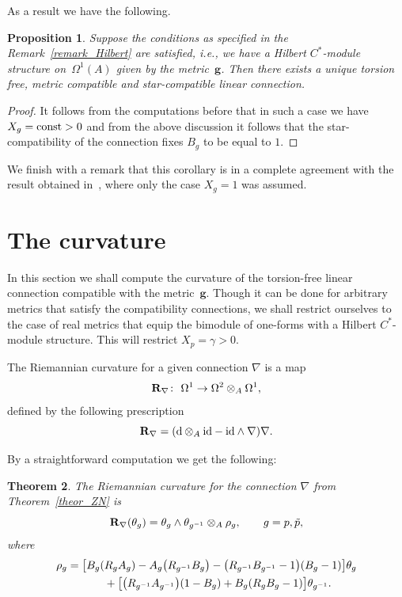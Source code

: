 \documentclass[10pt,a4paper]{amsart}
\numberwithin{equation}{section}
\newtheorem{Theorem}{Theorem}[section]
\newtheorem{Proposition}[Theorem]{Proposition}
 { \theoremstyle{definition}
\newtheorem{Definition}[Theorem]{Definition}
\newtheorem{Example}[Theorem]{Example}
\newtheorem{Remark}[Theorem]{Remark} }
\begin{document}
As a result we have the following.
\begin{Proposition} Suppose the conditions as specified in the Remark~{\rm \ref{remark_Hilbert}} are satisfied, i.e., we have a Hilbert $C^\ast$-module structure on~$\Omega^1(A)$ given by the metric~$\mathbf{g}$. Then there exists a unique torsion free, metric compatible and star-compatible linear
connection.
\end{Proposition}
\begin{proof}
It follows from the computations before that in such a case we have $X_g={\rm const}>0$ and from the above discussion it follows that the star-compatibility of the connection fixes $B_g$ to be equal to $1$.
\end{proof}

We finish with a remark that this corollary is in a complete agreement with the result obtained in~\cite{majid2020}, where only the case $X_g=1$ was
assumed.

\section{The curvature}
In this section we shall compute the curvature of the torsion-free linear connection compatible
with the metric~$\mathbf{g}$. Though it can be done for arbitrary metrics that satisfy the
compatibility connections, we shall restrict ourselves to the case of real metrics that equip
the bimodule of one-forms with a Hilbert $C^\ast$-module structure. This will restrict
$X_p=\gamma>0$.

\begin{Definition}
The Riemannian curvature for a given connection $\nabla$ is a map
\begin{equation*}
{\bf R}_\nabla\colon \ \Omega^1 \rightarrow \Omega^2 \otimes_A \Omega^1,
\end{equation*}
defined by the following prescription
\begin{equation*}
{\bf R}_\nabla= ({\rm d}\otimes_A\mathrm{id} -\mathrm{id}\wedge \nabla )\nabla.
\end{equation*}
\end{Definition}
By a straightforward computation we get the following:
\begin{Theorem}
The Riemannian curvature for the connection $\nabla$ from Theorem~{\rm \ref{theor_ZN}} is
\begin{equation*}
{\bf R}_\nabla(\theta_g)=\theta_g\wedge\theta_{g^{-1}}\otimes_A \rho_g, \qquad g=p,\tilde{p},
\end{equation*}
where
\begin{gather*}
\rho_g= \big[B_g(R_gA_g)-A_g\big(R_{g^{-1}}B_g\big)-\big(R_{g^{-1}}B_{g^{-1}}-1\big)(B_g-1)\big]\theta_g\\
\hphantom{\rho_g=}{} + \big[\big(R_{g^{-1}}A_{g^{-1}}\big)(1-B_g)+B_g(R_gB_g-1)\big]\theta_{g^{-1}}.
\end{gather*}
\end{Theorem}
\end{document}
